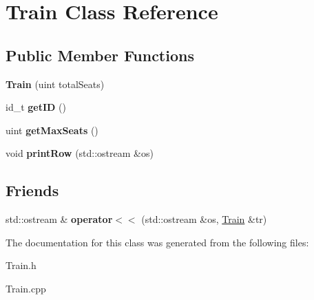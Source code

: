 \hypertarget{classTrain}{}\section{Train Class Reference}
\label{classTrain}
\subsection*{Public Member Functions}
\begin{DoxyCompactItemize}
\item 
\mbox{\label{classTrain_aa965be5e5d076d2743301c5d75ce4401}} 
{\bfseries Train} (uint total\+Seats)
\item 
\mbox{\label{classTrain_a7eed03f9e90521e3c5a3dc15fbeb749f}} 
id\+\_\+t {\bfseries get\+ID} ()
\item 
\mbox{\label{classTrain_a93cd372664bac4ba28fa36e40316444a}} 
uint {\bfseries get\+Max\+Seats} ()
\item 
\mbox{\label{classTrain_a3fd1c87c2152aa96cc6928f0aea37e21}} 
void {\bfseries print\+Row} (std\+::ostream \&os)
\end{DoxyCompactItemize}
\subsection*{Friends}
\begin{DoxyCompactItemize}
\item 
\mbox{\label{classTrain_ab4c39558eb319a2f509b128f1fc90bd8}} 
std\+::ostream \& {\bfseries operator$<$$<$} (std\+::ostream \&os, \mbox{\hyperlink{classTrain}{Train}} \&tr)
\end{DoxyCompactItemize}


The documentation for this class was generated from the following files\+:\begin{DoxyCompactItemize}
\item 
Train.\+h\item 
Train.\+cpp\end{DoxyCompactItemize}
